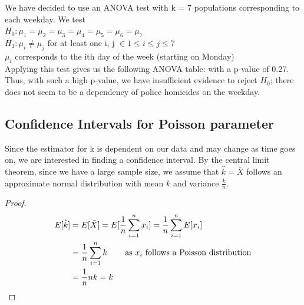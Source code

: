 \documentclass[12pt, titlepage]{article}
\begin{document}
We have decided to use an ANOVA test with k = 7 populations corresponding to each weekday. We test \\
$H_0: \mu_1 = \mu_2 = \mu_3  = \mu_4 = \mu_5 = \mu_6 = \mu_7$ \\ 
$H_1: \mu_i \neq \mu_j$ for at least one i, j $\in 1 \leq i \leq j \leq 7$ \\
$\mu_i$ corresponds to the ith day of the week (starting on Monday) \\

Applying this test gives us the following ANOVA table:
with a p-value of 0.27. Thus, with such a high p-value, we have insufficient evidence to reject $H_0$; there does not seem to be a dependency of police homicides on the weekday.

\pagebreak

\subsection{Confidence Intervals for Poisson parameter}
Since the estimator for k is dependent on our data and may change as time goes on, we are interested in finding a confidence interval. By the central limit theorem, since we have a large sample size, we assume that $\hat{k} = \bar{X}$ follows an approximate normal distribution with mean $k$ and variance $\frac{k}{n}$. \\

\begin{proof}
\begin{equation*}
\begin{split}
E[\hat{k}] & = E[\bar{X}] = E[\frac{1}{n}\sum_{i=1}^n x_i] = \frac{1}{n} \sum_{i=1}^n E[x_i] \\
& = \frac{1}{n} \sum_{i=1}^n k \hspace{5ex} \text{as $x_i$ follows a Poisson distribution}\\
& = \frac{1}{n} nk = k  
\end{split}
\end{equation*}
\end{proof}
\end{document}
